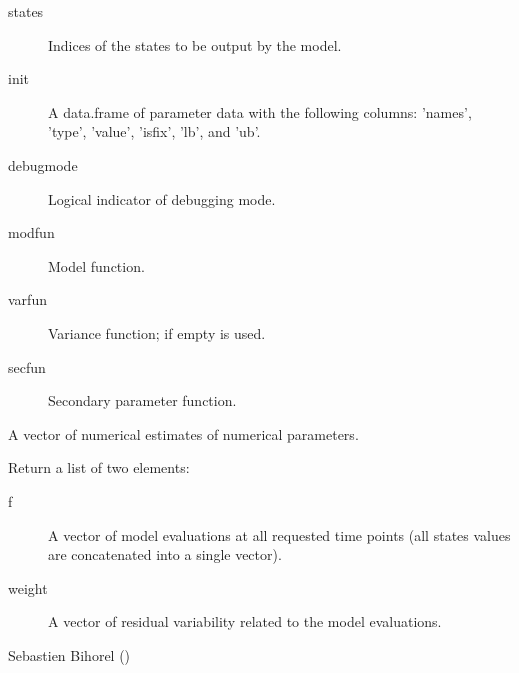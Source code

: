 \begin{Arguments}
\begin{ldescription}
\begin{description}
\begin{description}
\end{description}

\item[states] Indices of the states to be output by the model.
\item[init] A data.frame of parameter data with the following columns:
'names', 'type', 'value', 'isfix', 'lb', and 'ub'.
\item[debugmode] Logical indicator of debugging mode.
\item[modfun] Model function.
\item[varfun] Variance function; if empty  is
used.
\item[secfun] Secondary parameter function.

\end{description}


\item[\code{x}] A vector of numerical estimates of numerical parameters.
\end{ldescription}
\end{Arguments}
%
\begin{Value}
Return a list of two elements: \begin{description}

\item[f] A vector of model evaluations at all requested time points (all
states values are concatenated into a single vector).
\item[weight] A vector of residual variability related to the model
evaluations.

\end{description}

\end{Value}
%
\begin{Author}\relax
Sebastien Bihorel ()
\end{Author}
%
\begin{SeeAlso}\relax
{}
\end{SeeAlso}
